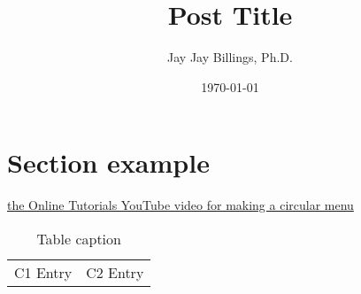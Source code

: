 \documentclass{article}
\title{Post Title}
\author{Jay Jay Billings, Ph.D.}
\date{\today}
\begin{document}
\maketitle

\section*{Section example}

\href{https://www.youtube.com/watch?v=ShPPkZEeLPo}{the Online Tutorials YouTube video for making a circular menu}

\begin{table}[h!]
\centering
\begin{tabularx}{ 0.8\textwidth }{ | >{\raggedright\arraybackslash}X | >{\centering\arraybackslash}X | }
 \hline
 \multicolumn{2}{|c|}{Table title} \\
 \hline
 C1 Entry & C2 Entry \\
 \hline
\end{tabularx}
\caption{Table caption}
\end{table}
\end{document}
